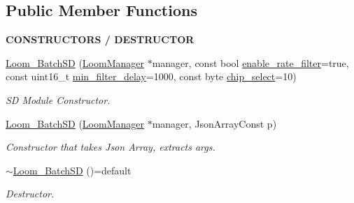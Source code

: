 \subsection*{Public Member Functions}
\begin{Indent}{\bf C\+O\+N\+S\+T\+R\+U\+C\+T\+O\+RS / D\+E\+S\+T\+R\+U\+C\+T\+OR}\par
\begin{DoxyCompactItemize}
\item 
\hyperlink{class_loom___batch_s_d_a54f3ee7cdf05189de3f43c34c0b30465}{Loom\+\_\+\+Batch\+SD} (\hyperlink{class_loom_manager}{Loom\+Manager} $\ast$manager, const bool \hyperlink{class_loom_log_plat_a6d343b76b79a1e51572bcf2991966e61}{enable\+\_\+rate\+\_\+filter}=true, const uint16\+\_\+t \hyperlink{class_loom_log_plat_a3d4ffe4204560b9677b8007be7f522be}{min\+\_\+filter\+\_\+delay}=1000, const byte \hyperlink{class_loom___batch_s_d_abe9e47bc3e511e89056b2da32f580eed}{chip\+\_\+select}=10)
\begin{DoxyCompactList}\small\item\em SD Module Constructor. \end{DoxyCompactList}\item 
\hyperlink{class_loom___batch_s_d_a4341896658e6e8ab97a5ff280d9dc254}{Loom\+\_\+\+Batch\+SD} (\hyperlink{class_loom_manager}{Loom\+Manager} $\ast$manager, Json\+Array\+Const p)
\begin{DoxyCompactList}\small\item\em Constructor that takes Json Array, extracts args. \end{DoxyCompactList}\item 
\hyperlink{class_loom___batch_s_d_a1b9cea47682085b0eebd8792ceb191fe}{$\sim$\+Loom\+\_\+\+Batch\+SD} ()=default
\begin{DoxyCompactList}\small\item\em Destructor. \end{DoxyCompactList}\end{DoxyCompactItemize}
\end{Indent}
